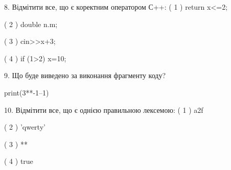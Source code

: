\documentclass[11pt]{article}
\begin{document}
8. %
Відмітити все, що є коректним оператором С++:
( 1 ) return x<=2;

( 2 ) double n.m;

( 3 ) cin>>x+3;

( 4 ) if (1>2) x=10;
\vspace{5mm}

9. Що буде виведено за виконання фрагменту коду?

print(3**-1--1)
\vspace{5mm}

10. %
Відмітити все, що є однією правильною лексемою:
( 1 ) a2f

( 2 ) 'qwerty'

( 3 ) **

( 4 ) true
\vspace{5mm}

\newpage
\end{document}
